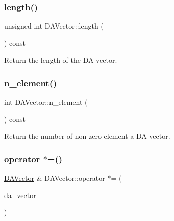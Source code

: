 \mbox{\label{struct_d_a_vector_a295d0ae4da5ab95ae2a367365d521f64}} 
\subsubsection{\texorpdfstring{length()}{length()}}
{\footnotesize\ttfamily unsigned int D\+A\+Vector\+::length (\begin{DoxyParamCaption}{ }\end{DoxyParamCaption}) const}



Return the length of the DA vector. 

\mbox{\label{struct_d_a_vector_acc7180677f26baf2a1ac32efad7a2bf5}} 
\subsubsection{\texorpdfstring{n\_element()}{n\_element()}}
{\footnotesize\ttfamily int D\+A\+Vector\+::n\+\_\+element (\begin{DoxyParamCaption}{ }\end{DoxyParamCaption}) const}

Return the number of non-\/zero element a DA vector. \mbox{\label{struct_d_a_vector_a3483f9aa176b982614cf3146fd651651}} 
\subsubsection{\texorpdfstring{operator $\ast$=()}{operator *=()}\hspace{0.1cm}{\footnotesize\ttfamily [1/4]}}
{\footnotesize\ttfamily \mbox{\hyperlink{struct_d_a_vector}{D\+A\+Vector}} \& D\+A\+Vector\+::operator $\ast$= (\begin{DoxyParamCaption}\item[{const \mbox{\hyperlink{struct_d_a_vector}{D\+A\+Vector}} \&}]{da\+\_\+vector }\end{DoxyParamCaption})}

\mbox{\label{struct_d_a_vector_a57219674aef4340b85fca475016f3b16}} 
